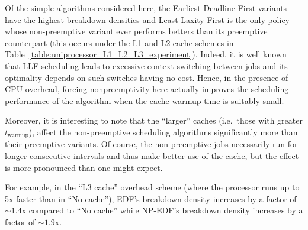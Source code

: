 \documentclass[11pt]{article}
\newcommand{\tabref}[1]{Table~\ref{#1}}
\begin{document}
\begin{table}[H]
	\centering
	\caption{Average breakdown densities from our uniprocessor experiment under the four overhead schemes representing effective use of the various caches in the typical memory hierarchy. A prefix of ``NP-'' denotes the non-preemptive variant of the scheduling algorithm.}
	\label{table:uniprocessor_L1_L2_L3_experiment}
\end{table}

Of the simple algorithms considered here, the Earliest-Deadline-First variants have the highest breakdown densities and Least-Laxity-First is the only policy whose non-preemptive variant ever performs betters than its preemptive counterpart (this occurs under the L1 and L2 cache schemes in \tabref{table:uniprocessor_L1_L2_L3_experiment}). Indeed, it is well known that LLF scheduling leads to excessive context switching between jobs and its optimality depends on such switches having no cost. Hence, in the presence of CPU overhead, forcing nonpreemptivity here actually improves the scheduling performance of the algorithm when the cache warmup time is suitably small.

Moreover, it is interesting to note that the ``larger'' caches (i.e.\ those with greater $t_\text{warmup}$), affect the non-preemptive scheduling algorithms significantly more than their preemptive variants. Of course, the non-preemptive jobs necessarily run for longer consecutive intervals and thus make better use of the cache, but the effect is more pronounced than one might expect.

For example, in the ``L3 cache'' overhead scheme (where the processor runs up to 5x faster than in ``No cache''), EDF's breakdown density increases by a factor of ${\sim}1.4$x compared to ``No cache'' while NP-EDF's breakdown density increases by a factor of ${\sim}1.9$x.
\end{document}
